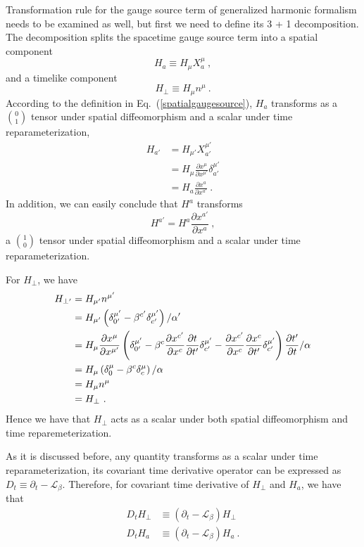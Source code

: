 Transformation rule for the gauge source term of generalized harmonic formalism needs to be examined as well, but first we need to define its 3 + 1 decomposition. The decomposition splits the spacetime gauge source term into a spatial component
\begin{equation}\label{spatialgaugesource}
	H_{a} \equiv H_{\mu}X^{\mu}_{a} \ ,
\end{equation}
and a timelike component
\begin{equation}
	H_{\perp} \equiv H_{\mu}n^{\mu} \ .
\end{equation}
According to the definition in Eq.~(\ref{spatialgaugesource}), $H_{a}$ transforms as a $0 \choose 1$ tensor under spatial diffeomorphism and a scalar under time reparameterization, 
\begin{align}
H_{a'} & = H_{\mu'}X^{\mu'}_{a'}\\
& = H_{\mu}\frac{\partial x^{\mu}}{\partial x^{\mu'}}\delta^{\mu'}_{a'}\\
& = H_{a}\frac{\partial x^{a}}{\partial x^{a'}} \ .
\end{align}
In addition, we can easily conclude that $H^{a}$ transforms 
\begin{equation}
H^{a'} = H^{a}\frac{\partial x^{a'}}{\partial x^{a}} \ ,
\end{equation}
a $1 \choose 0$ tensor under spatial diffeomorphism and a scalar under time reparameterization. 

For $H_{\perp}$, we have
\begin{align}
H_{\perp'} & = H_{\mu'}n^{\mu'} \notag\\
& = H_{\mu'}\left(\delta^{\mu'}_{0'} - \beta^{c'}\delta_{c'}^{\mu'}\right)/\alpha'\notag\\
& = H_{\mu}\frac{\partial x^{\mu}}{\partial x^{\mu'}}\left(\delta^{\mu'}_{0'} - \beta^{c}\frac{\partial x^{c'}}{\partial x^{c}}\frac{\partial t}{\partial t'}\delta^{\mu'}_{c'} - \frac{\partial x^{c'}}{\partial x^{c}}\frac{\partial x^{c}}{\partial t'}\delta^{\mu'}_{c'}\right)\frac{\partial t'}{\partial t} / \alpha \notag\\
& = H_{\mu}\left(\delta^{\mu}_{0} - \beta^{c}\delta_{c}^{\mu}\right)/\alpha \notag\\
& = H_{\mu}n^{\mu} \notag\\
& = H_{\perp} \ .
\end{align}
Hence we have that $H_{\perp}$ acts as a scalar under both spatial diffeomorphism and time reparemeterization. 

As it is discussed before, any quantity transforms as a scalar under time reparameterization, its covariant time derivative operator can be expressed as $D_{t} \equiv \partial_{t} - \mathcal{L}_{\beta}$. Therefore, for covariant time derivative of $H_{\perp}$ and $H_{a}$, we have that
\begin{subequations}
	\begin{align}
		D_{t}H_{\perp} &\equiv \left(\partial_{t} - \mathcal{L}_{\beta}\right)H_{\perp}\\
		D_{t}H_{a} &\equiv \left(\partial_{t} - \mathcal{L}_{\beta}\right)H_{a} \ .
	\end{align}
\end{subequations}

